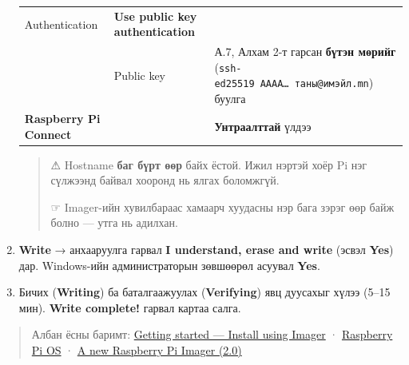 \begin{enumerate}
\begin{longtable}[]{@{}lll@{}}
\begin{minipage}[t]{0.30\columnwidth}
  Authentication\strut
  \end{minipage} & \begin{minipage}[t]{0.30\columnwidth}\raggedright
  \textbf{Use public key authentication}\strut
  \end{minipage}\tabularnewline
  \begin{minipage}[t]{0.30\columnwidth}\raggedright
  \strut
  \end{minipage} & \begin{minipage}[t]{0.30\columnwidth}\raggedright
  Public key\strut
  \end{minipage} & \begin{minipage}[t]{0.30\columnwidth}\raggedright
  А.7, Алхам 2-т гарсан \textbf{бүтэн мөрийг} (\texttt{ssh-ed25519\ AAAA\ldots{}\ таны@имэйл.\allowbreak{}mn}) буулга\strut
  \end{minipage}\tabularnewline
  \begin{minipage}[t]{0.30\columnwidth}\raggedright
  \textbf{Raspberry Pi Connect}\strut
  \end{minipage} & \begin{minipage}[t]{0.30\columnwidth}\raggedright
  \strut
  \end{minipage} & \begin{minipage}[t]{0.30\columnwidth}\raggedright
  \textbf{Унтраалттай} үлдээ\strut
  \end{minipage}\tabularnewline
  \bottomrule
  \end{longtable}\endgroup

  \begin{quote}
  ⚠ Hostname \textbf{баг бүрт өөр} байх ёстой. Ижил нэртэй хоёр Pi нэг сүлжээнд байвал хооронд нь ялгах боломжгүй.

  ☞ Imager-ийн хувилбараас хамаарч хуудасны нэр бага зэрэг өөр байж болно --- утга нь адилхан.
  \end{quote}
\item
  \textbf{Write} → анхааруулга гарвал \textbf{I understand, erase and write} (эсвэл \textbf{Yes}) дар. Windows-ийн администраторын зөвшөөрөл асуувал \textbf{Yes}.
\item
  Бичих (\textbf{Writing}) ба баталгаажуулах (\textbf{Verifying}) явц дуусахыг хүлээ (5--15 мин). \textbf{Write complete!} гарвал картаа салга.
\end{enumerate}

\begin{quote}
Албан ёсны баримт: \href{https://www.raspberrypi.com/documentation/computers/getting-started.html}{Getting started --- Install using Imager} · \href{https://www.raspberrypi.com/documentation/computers/os.html}{Raspberry Pi OS} · \href{https://www.raspberrypi.com/news/a-new-raspberry-pi-imager/}{A new Raspberry Pi Imager (2.\allowbreak{}0)}
\end{quote}

